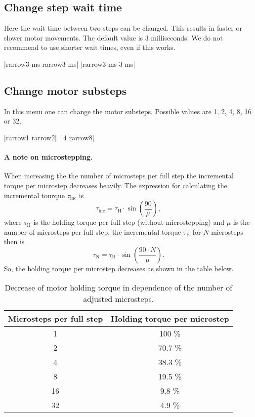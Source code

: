 \subsection{Change step wait time}
\label{menu_step_wait_time}
Here the wait time between two steps can be changed. This results in
faster or slower motor movements. The default value is 3 milliseconds.
We do not recommend to use shorter wait times, even if this works.
\begin{center}
  |{rarrow}3 ms   {rarrow}3 ms|
             |{rarrow}3 ms    3 ms|
\end{center}


\subsection{Change motor substeps}
In this menu one can change the motor substeps. Possible values are 1,
2, 4, 8, 16 or 32.
\begin{center}
  |{rarrow}1      {rarrow}2|
             | 4      {rarrow}8|
\end{center}


\paragraph{A note on microstepping.}
When increasing the the number of microsteps per full step the incremental
torque per microstep decreases heavily. The expression for calculating
the incremental tourque $\tau_{\text{inc}}$ is
\begin{equation*}
  \tau_{\text{inc}} = \tau_{\text{H}} \cdot \sin \left( \frac{90}{\mu} \right),
\end{equation*}
where $\tau_{\text{H}}$ is the holding torque per full step (without
microstepping) and $\mu$ is the number of microsteps per full step.
the incremental torque $\tau_{\text{H}}$ for $N$ microsteps then is
\begin{equation*}
  \tau_{\text{N}} = \tau_{\text{H}} \cdot \sin \left( \frac{90\cdot N}{\mu} \right).
\end{equation*}
So, the holding torque per microstep decreases as shown in the table below.
\begin{table}
  \centering
  \begin{tabular}{cc}
    \toprule
    \textbf{Microsteps per full step} & \textbf{Holding torque per microstep} \\
    \toprule
    1 & 100 \% \\ \midrule
    2 & 70.7 \%\\ \midrule
    4 & 38.3 \% \\ \midrule
    8 & 19.5 \% \\ \midrule
    16 & 9.8 \% \\ \midrule
    32 & 4.9 \% \\
    \bottomrule
  \end{tabular}
  \caption{Decrease of motor holding torque in dependence of the number of
           adjusted microsteps.}
\end{table}


